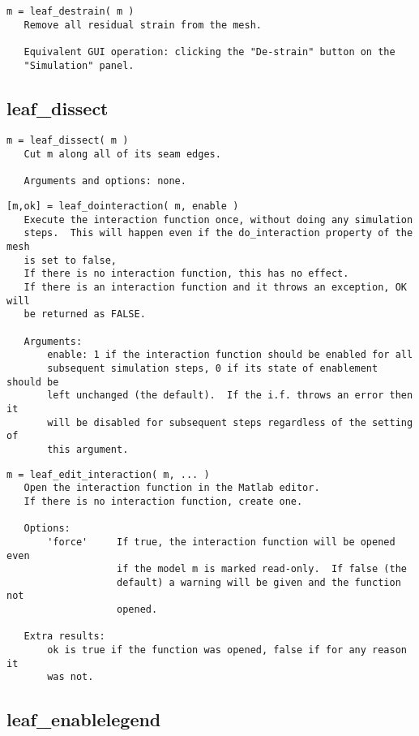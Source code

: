 \begin{verbatim}
m = leaf_destrain( m )
   Remove all residual strain from the mesh.

   Equivalent GUI operation: clicking the "De-strain" button on the
   "Simulation" panel.
\end{verbatim}

\subsection{leaf\_dissect}\label{section-leaf-dissect}

\begin{verbatim}
m = leaf_dissect( m )
   Cut m along all of its seam edges.

   Arguments and options: none.
\end{verbatim}

\begin{verbatim}
[m,ok] = leaf_dointeraction( m, enable )
   Execute the interaction function once, without doing any simulation
   steps.  This will happen even if the do_interaction property of the mesh
   is set to false, 
   If there is no interaction function, this has no effect.
   If there is an interaction function and it throws an exception, OK will
   be returned as FALSE.

   Arguments:
       enable: 1 if the interaction function should be enabled for all
       subsequent simulation steps, 0 if its state of enablement should be
       left unchanged (the default).  If the i.f. throws an error then it
       will be disabled for subsequent steps regardless of the setting of
       this argument.
\end{verbatim}

\begin{verbatim}
m = leaf_edit_interaction( m, ... )
   Open the interaction function in the Matlab editor.
   If there is no interaction function, create one.

   Options:
       'force'     If true, the interaction function will be opened even
                   if the model m is marked read-only.  If false (the
                   default) a warning will be given and the function not
                   opened.

   Extra results:
       ok is true if the function was opened, false if for any reason it
       was not.
\end{verbatim}

\subsection{leaf\_enablelegend}\label{section-leaf-enablelegend}

